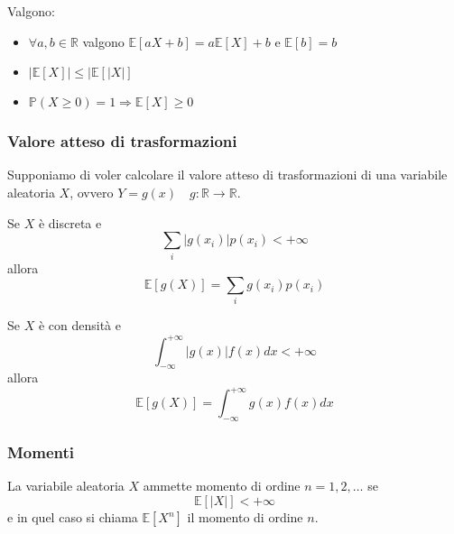 \begin{proposition}
	Valgono:
	\begin{itemize}
		\item $\forall a,b \in \mathbb{R}$ valgono $\mathbb{E}[aX+b]=a\mathbb{E}[X] + b$ e $\mathbb{E}[b] = b$
		\item $\lvert \mathbb{E}[X]\rvert \leq \lvert \mathbb{E}[\lvert X \rvert]$
		\item $\mathbb{P}(X \geq 0)=1 \Longrightarrow \mathbb{E}[X] \geq 0$
	\end{itemize}
\end{proposition}

\subsubsection{Valore atteso di trasformazioni}
Supponiamo di voler calcolare il valore atteso di trasformazioni di una variabile aleatoria $X$, ovvero $Y=g(x) \quad g:\mathbb{R} \to \mathbb{R}$.
\begin{proposition}
	Se $X$ è discreta e
	\begin{equation*}
		\sum_{i} \lvert g(x_i) \rvert p(x_i) < +\infty
	\end{equation*}
	allora
	\begin{equation}
		\mathbb{E}[g(X)] = \sum_{i} g(x_i)p(x_i)
	\end{equation}
\end{proposition}
\begin{proposition}
	Se $X$ è con densità e
	\begin{equation*}
		\int_{-\infty}^{+\infty}\lvert g(x)\rvert f(x)dx < +\infty
	\end{equation*}
	allora
	\begin{equation}
		\mathbb{E}[g(X)] = \int_{-\infty}^{+\infty} g(x) f(x)dx
	\end{equation}
\end{proposition}
	
\subsubsection{Momenti}
\begin{definition}[Momento]
	La variabile aleatoria $X$ ammette momento di ordine $n=1,2,\ldots$ se
	\begin{equation*}
		\mathbb{E} [\lvert X \rvert] < + \infty
	\end{equation*}
	e in quel caso si chiama $\mathbb{E}[X^n]$ il momento di ordine $n$.
\end{definition}

